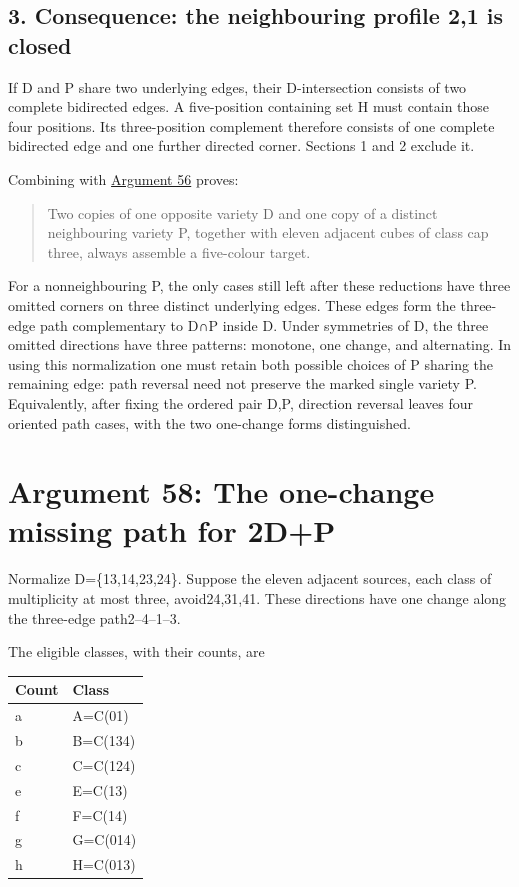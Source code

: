 \documentclass[
  10pt,
]{article}
\begin{document}
\hypertarget{consequence-the-neighbouring-profile-21-is-closed}{%
\subsection*{3. Consequence: the neighbouring profile 2,1 is
closed}\label{consequence-the-neighbouring-profile-21-is-closed}}

If D and P share two underlying edges, their D-intersection consists of
two complete bidirected edges. A five-position containing set H must
contain those four positions. Its three-position complement therefore
consists of one complete bidirected edge and one further directed
corner. Sections 1 and 2 exclude it.

Combining with \protect\hyperlink{arg-56}{Argument 56} proves:

\begin{quote}
Two copies of one opposite variety D and one copy of a distinct
neighbouring variety P, together with eleven adjacent cubes of class cap
three, always assemble a five-colour target.
\end{quote}

For a nonneighbouring P, the only cases still left after these
reductions have three omitted corners on three distinct underlying
edges. These edges form the three-edge path complementary to D∩P inside
D. Under symmetries of D, the three omitted directions have three
patterns: monotone, one change, and alternating. In using this
normalization one must retain both possible choices of P sharing the
remaining edge: path reversal need not preserve the marked single
variety P. Equivalently, after fixing the ordered pair D,P, direction
reversal leaves four oriented path cases, with the two one-change forms
distinguished.

\hypertarget{arg-58}{%
\section{Argument 58: The one-change missing path for
2D+P}\label{arg-58}}

Normalize D=\{13,14,23,24\}. Suppose the eleven adjacent sources, each
class of multiplicity at most three, avoid24,31,41. These directions
have one change along the three-edge path2--4--1--3.

The eligible classes, with their counts, are

\begin{longtable}[]{@{}ll@{}}
\toprule\noalign{}
Count & Class \\
\midrule\noalign{}
\endhead
\bottomrule\noalign{}
\endlastfoot
a & A=C(01) \\
b & B=C(134) \\
c & C=C(124) \\
e & E=C(13) \\
f & F=C(14) \\
g & G=C(014) \\
h & H=C(013) \\
\end{longtable}
\end{document}

